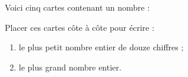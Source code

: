 \begin{exercice}{}{}
    Voici cinq cartes contenant un nombre :
    \begin{center}
        \qquad {} \qquad {} \qquad {} \qquad{}
    \end{center}
    Placer ces cartes côte à côte pour écrire :
    \begin{enumerate}
       \item le plus petit nombre entier de douze chiffres ;
       \item le plus grand nombre entier.
    \end{enumerate}
 \end{exercice}